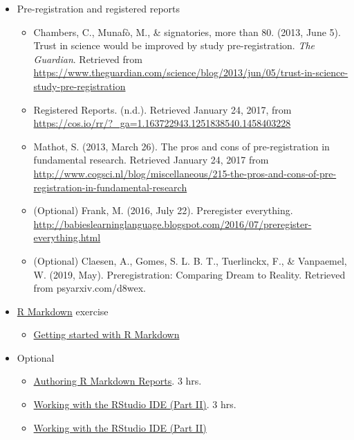 \documentclass[
]{article}
\providecommand{\tightlist}{%
  \setlength{\itemsep}{0pt}\setlength{\parskip}{0pt}}
\begin{document}
\begin{itemize}
\tightlist
\item
  Pre-registration and registered reports

  \begin{itemize}
  \tightlist
  \item
    Chambers, C., Munafò, M., \& signatories, more than 80. (2013, June
    5). Trust in science would be improved by study pre-registration.
    \emph{The Guardian}. Retrieved from
    \url{https://www.theguardian.com/science/blog/2013/jun/05/trust-in-science-study-pre-registration}
  \item
    Registered Reports. (n.d.). Retrieved January 24, 2017, from
    \url{https://cos.io/rr/?_ga=1.163722943.1251838540.1458403228}
  \item
    Mathot, S. (2013, March 26). The pros and cons of pre-registration
    in fundamental research. Retrieved January 24, 2017 from
    \url{http://www.cogsci.nl/blog/miscellaneous/215-the-pros-and-cons-of-pre-registration-in-fundamental-research}
  \item
    (Optional) Frank, M. (2016, July 22). Preregister everything.
    \url{http://babieslearninglanguage.blogspot.com/2016/07/preregister-everything.html}
  \item
    (Optional) Claesen, A., Gomes, S. L. B. T., Tuerlinckx, F., \&
    Vanpaemel, W. (2019, May). Preregistration: Comparing Dream to
    Reality. Retrieved from psyarxiv.com/d8wex.
  \end{itemize}
\item
  \href{http://rmarkdown.rstudio.com/}{R Markdown} exercise

  \begin{itemize}
  \tightlist
  \item
    \href{https://www.rstudio.com/resources/webinars/getting-started-with-r-markdown/}{Getting
    started with R Markdown}
  \end{itemize}
\item
  Optional

  \begin{itemize}
  \tightlist
  \item
    \href{https://www.datacamp.com/courses/reporting-with-r-markdown}{Authoring
    R Markdown Reports}. 3 hrs.
  \item
    \href{https://www.datacamp.com/courses/working-with-the-rstudio-ide-part-1}{Working
    with the RStudio IDE (Part II)}. 3 hrs.
  \item
    \href{https://www.datacamp.com/courses/working-with-the-rstudio-ide-part-2}{Working
    with the RStudio IDE (Part II)}
  \end{itemize}
\end{itemize}
\end{document}
